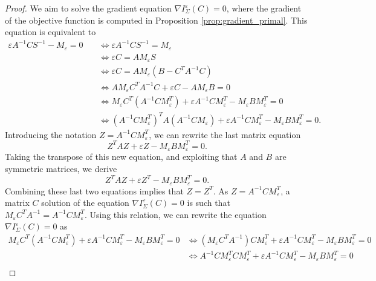 \documentclass[]{article}
\numberwithin{equation}{section}
\theoremstyle{plain}
\begin{document}
\begin{proof}
We aim to solve the gradient equation $\nabla I_{\Sigma}^\varepsilon(C)= 0$, where the gradient of the objective function is computed in Proposition \ref{prop:gradient_primal}. This equation is equivalent to
    \begin{align*}
        \varepsilon A^{-1}C S^{-1}- M_{\varepsilon}= 0 \quad & \Leftrightarrow \varepsilon A^{-1}C S^{-1} = M_{\varepsilon}\\
       & \Leftrightarrow \varepsilon C = A M_{\varepsilon} S  \\
       & \Leftrightarrow \varepsilon C = A M_{\varepsilon}(B - C^TA^{-1}C)  \\
        & \Leftrightarrow  A M_{\varepsilon} C^TA^{-1}C + \varepsilon C - AM_{\varepsilon}B=0 \\
       &\Leftrightarrow  M_{\varepsilon} C^T(A^{-1}CM_{\varepsilon}^T) + \varepsilon A^{-1}CM_{\varepsilon}^T- M_{\varepsilon}BM_{\varepsilon}^T=0 \\
       & \Leftrightarrow  (A^{-1}C M_{\varepsilon}^T)^TA (A^{-1}C M_{\varepsilon}) +\varepsilon A^{-1}CM_{\varepsilon}^T- M_{\varepsilon}B M_{\varepsilon}^T=0.
    \end{align*}
    Introducing the notation $Z=A^{-1}CM_{\varepsilon}^T$, we can rewrite the last matrix equation
    \begin{equation}
        Z^TAZ + \varepsilon Z - M_{\varepsilon}BM_{\varepsilon}^T=0.
    \end{equation}
    Taking the transpose of this new equation, and exploiting that $A$ and $B$ are symmetric matrices, we derive
    \begin{equation}
        Z^TAZ + \varepsilon Z^T- M_{\varepsilon}BM_{\varepsilon}^T=0.
    \end{equation}
    Combining these last two equations implies that $Z = Z^T$. As $Z = A^{-1}CM_{\varepsilon}^T$, a matrix $C$ solution of the equation $\nabla I_{\Sigma}^\varepsilon(C)=0$ is such that $M_{\varepsilon}C^TA^{-1}=A^{-1}C M_{\varepsilon}^T$. Using this relation, we can rewrite the equation $\nabla I_{\Sigma}^\varepsilon(C)=0$ as 
    \begin{align*}
        M_{\varepsilon}C^T(A^{-1}C M_{\varepsilon}^T) +\varepsilon A^{-1}CM_{\varepsilon}^T- M_{\varepsilon}BM_{\varepsilon}^T=0 & \Leftrightarrow (M_{\varepsilon}C^TA^{-1})CM_{\varepsilon}^T+\varepsilon A^{-1}CM_{\varepsilon}^T- M_{\varepsilon}BM_{\varepsilon}^T=0 \\
        & \Leftrightarrow A^{-1}CM_\varepsilon^T CM_{\varepsilon}^T+\varepsilon A^{-1}CM_{\varepsilon}^T- M_{\varepsilon}BM_\varepsilon^T=0 \\

\end{align*}
\end{proof}
\end{document}
